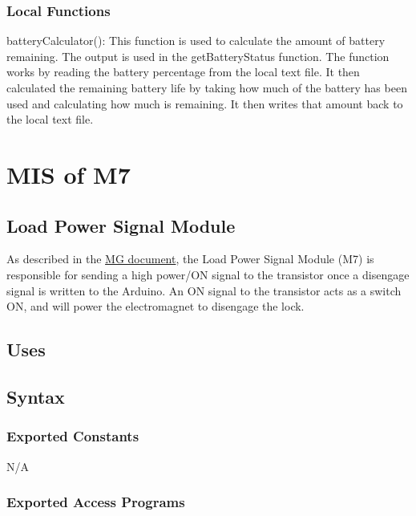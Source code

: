 \documentclass[12pt, titlepage]{article}
\begin{document}
\subsubsection{Local Functions}

\noindent batteryCalculator():
This function is used to calculate the amount of battery remaining. The output is used in the getBatteryStatus function. The function works by reading the battery percentage from the local text file. It then calculated the remaining battery life by taking how much of the battery has been used and calculating how much is remaining. It then writes that amount back to the local text file. 




\section{MIS of M7  \label{LoadPowerSignal}}

\subsection{Load Power Signal Module}

As described in the \href{https://github.com/NevoAbigail/Capstone/blob/main/docs/Design/SoftArchitecture/MG.pdf}{MG document}, the Load Power Signal Module (M7) is responsible for sending a high power/ON signal to the transistor once a disengage signal is written to the Arduino. An ON signal to the transistor acts as a switch ON, and will power the electromagnet to disengage the lock. 

\subsection{Uses}

\subsection{Syntax}

\subsubsection{Exported Constants}

N/A

\subsubsection{Exported Access Programs}
\end{document}
